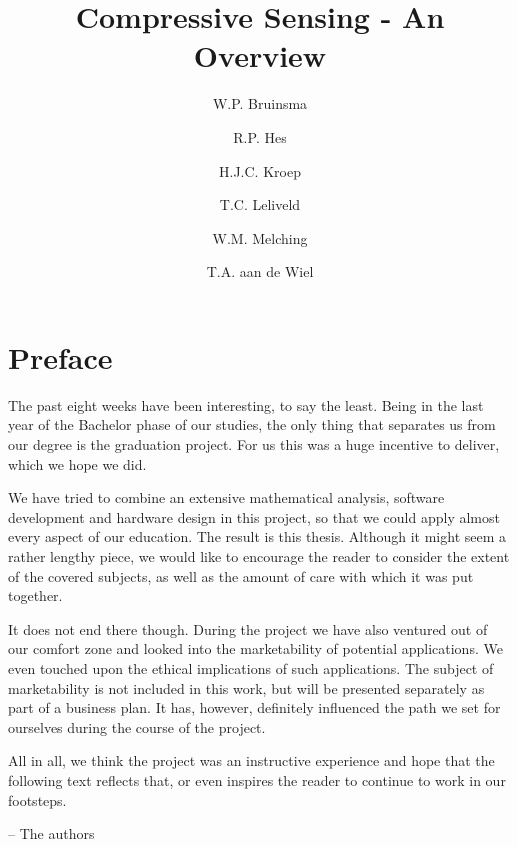 \documentclass[a4paper, openany, oneside]{memoir}
\title{Compressive Sensing - An Overview}
\author{W.P. Bruinsma \and R.P. Hes \and H.J.C. Kroep \and T.C. Leliveld \and W.M. Melching \and T.A. aan de Wiel}
\begin{document}
\chapter{Preface}
The past eight weeks have been interesting, to say the least. Being in the last year of the Bachelor phase of our studies, the only thing that separates us from our degree is the graduation project. For us this was a huge incentive to deliver, which we hope we did. 

We have tried to combine an extensive mathematical analysis, software development and hardware design in this project, so that we could apply almost every aspect of our education. The result is this thesis. Although it might seem a rather lengthy piece, we would like to encourage the reader to consider the extent of the covered subjects, as well as the amount of care with which it was put together.

It does not end there though. During the project we have also ventured out of our comfort zone and looked into the marketability of potential applications. We even touched upon the ethical implications of such applications. The subject of marketability is not included in this work, but will be presented separately as part of a business plan. It has, however, definitely influenced the path we set for ourselves during the course of the project.

All in all, we think the project was an instructive experience and hope that the following text reflects that, or even inspires the reader to continue to work in our footsteps.

\raggedleft -- The authors \qquad\qquad\qquad
\end{document}
